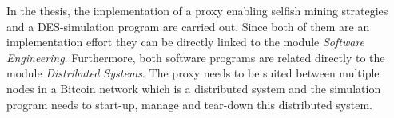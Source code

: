 \documentclass{scrartcl}
\begin{document}
In the thesis, the implementation of a proxy enabling selfish mining strategies and a DES-simulation program are carried out. Since both of them are an implementation effort they can be directly linked to the module \textit{Software Engineering}. Furthermore, both software programs are related directly to the module \textit{Distributed Systems}. The proxy needs to be suited between multiple nodes in a Bitcoin network which is a distributed system and the simulation program needs to start-up, manage and tear-down this distributed system.


\end{document}
